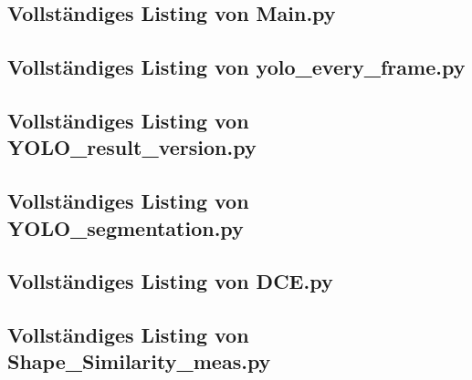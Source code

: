 \subsection{Vollständiges Listing von Main.py}{
    }

\subsection{Vollständiges Listing von yolo\_every\_frame.py}{
    }

\subsection{Vollständiges Listing von YOLO\_result\_version.py}{
    }

\subsection{Vollständiges Listing von YOLO\_segmentation.py}{
    }

\subsection{Vollständiges Listing von DCE.py}{
    }

\subsection{ Vollständiges Listing von Shape\_Similarity\_meas.py}{
    
}

